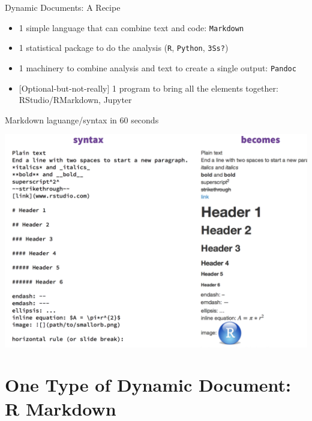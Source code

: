 \documentclass[ignorenonframetext,]{beamer}
\providecommand{\tightlist}{%
  \setlength{\itemsep}{0pt}\setlength{\parskip}{0pt}}
\begin{document}
\begin{frame}[fragile]{Dynamic Documents: A Recipe}
\protect\hypertarget{dynamic-documents-a-recipe}{}

\begin{itemize}
\tightlist
\item
  1 simple language that can combine text and code: \texttt{Markdown}
\item
  1 statistical package to do the analysis (\texttt{R}, \texttt{Python},
  \texttt{3S\textquotesingle{}s?})
\item
  1 machinery to combine analysis and text to create a single output:
  \texttt{Pandoc}
\item
  {[}Optional-but-not-really{]} 1 program to bring all the elements
  together: RStudio/RMarkdown, Jupyter
\end{itemize}

\end{frame}

\begin{frame}{Markdown laguange/syntax in 60 seconds}
\protect\hypertarget{markdown-laguangesyntax-in-60-seconds}{}

\includegraphics{../Images/RStudioCS.png}

\end{frame}

\hypertarget{one-type-of-dynamic-document-r-markdown}{%
\section{One Type of Dynamic Document: R
Markdown}\label{one-type-of-dynamic-document-r-markdown}}
\end{document}
